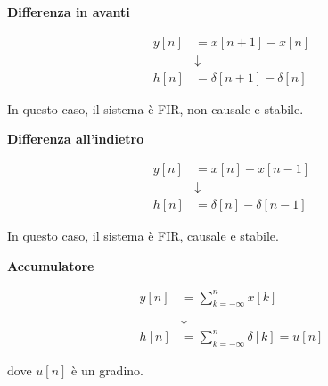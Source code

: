 \textbf{Differenza in avanti} \newline 

{
    \Large 
    \begin{equation}
        \begin{split}
            y \left[ n\right] &= x \left[ n + 1\right] - x \left[ n \right]
            \\
            &\downarrow
            \\
            h \left[ n \right] &= \delta \left[ n + 1\right] - \delta \left[ n \right]
        \end{split}
    \end{equation}
}

In questo caso, il sistema è FIR, non causale e stabile. \newline 

\textbf{Differenza all'indietro} \newline 

{
    \Large 
    \begin{equation}
        \begin{split}
            y \left[ n\right] &= x \left[ n\right] - x \left[ n - 1 \right]
            \\
            &\downarrow
            \\
            h \left[ n \right] &= \delta \left[ n \right] - \delta \left[ n - 1\right]
        \end{split}
    \end{equation}
}

In questo caso, il sistema è FIR, causale e stabile. \newline 

\newpage 

\textbf{Accumulatore} \newline 

{
    \Large 
    \begin{equation}
        \begin{split}
        y \left[ n\right]
        &= 
        \sum_{k = - \infty}^{n}
        x \left[ k\right]
       \\
       &\downarrow
       \\
       h \left[ n\right]
       &= 
        \sum_{k = - \infty}^{n} 
        \delta \left[ k\right]
        = 
        u \left[ n\right]
    \end{split}
    \end{equation}
}

dove $u \left[ n\right]$ è un gradino. \newline 


